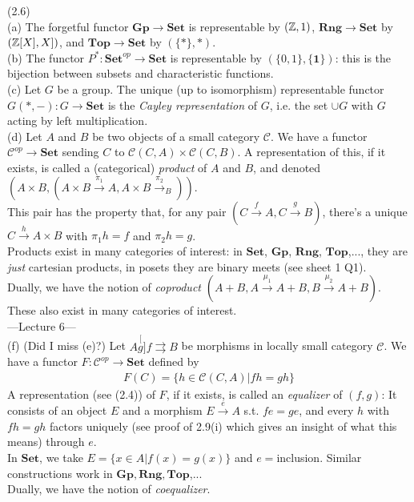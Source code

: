 \documentclass[a4paper]{article}
\begin{document}
\begin{eg} (2.6)\\
    (a) The forgetful functor $\mathbf{Gp} \to \mathbf{Set}$ is representable by $(\mathbb{Z},1)$, $\mathbf{Rng} \to \mathbf{Set}$ by $(\mathbb{Z}[X],X])$, and $\mathbf{Top} \to \mathbf{Set}$ by $(\{*\},*)$.\\
    (b) The functor $P^*: \mathbf{Set}^{op} \to \mathbf{Set}$ is representable by $(\{0,1\},\{\mathbf{1}\})$: this is the bijection between subsets and characteristic functions.\\
    (c) Let $G$ be a group. The unique (up to isomorphism) representable functor $G(*,-): G \to \mathbf{Set}$ is the \emph{Cayley representation} of $G$, i.e. the set $\cup G$ with $G$ acting by left multiplication.\\
    (d) Let $A$ and $B$ be two objects of a small category $\mathcal{C}$. We have a functor $\mathcal{C}^{op} \to \mathbf{Set}$ sending $C$ to $\mathcal{C}(C,A) \times \mathcal{C}(C,B)$. A representation of this, if it exists, is called a (categorical) \emph{product} of $A$ and $B$, and denoted $(A \times B,(A \times B \xrightarrow{\pi_1} A, A \times B \xrightarrow{\pi_2}_B))$.\\
    This pair has the property that, for any pair $(C \xrightarrow{f}A,C\xrightarrow{g}B)$, there's a unique $C \xrightarrow{h} A \times B$ with $\pi_1 h = f$ and $\pi_2 h = g$.\\
    Products exist in many categories of interest: in $\mathbf{Set}$, $\mathbf{Gp}$, $\mathbf{Rng}$, $\mathbf{Top}$,..., they are \emph{just} cartesian products, in posets they are binary meets (see sheet 1 Q1).\\
    Dually, we have the notion of \emph{coproduct} $(A+B,A \xrightarrow{\mu_1} A + B, B \xrightarrow{\mu_2}A+B)$.\\
    These also exist in many categories of interest.\\
    ---Lecture 6---\\
    (f) (Did I miss (e)?) Let $A \stackrel[g]{f}{\rightrightarrows} B$ be morphisms in locally small category $\mathcal{C}$. We have a functor $F:\mathcal{C}^{op} \to \mathbf{Set}$ defined by 
    \begin{equation*}
        \begin{aligned}
            F(C) = \{h \in \mathcal{C}(C,A) | fh = gh\}
        \end{aligned}
    \end{equation*}
    A representation (see (2.4)) of $F$, if it exists, is called an \emph{equalizer} of $(f,g)$: It consists of an object $E$ and a morphism $E \xrightarrow{e} A$ s.t. $fe=ge$, and every $h$ with $fh=gh$ factors uniquely (see proof of 2.9(i) which gives an insight of what this means) through $e$.\\
    In $\mathbf{Set}$, we take $E = \{x \in A | f(x) = g(x) \}$ and $e=$inclusion. Similar constructions work in $\mathbf{Gp},\mathbf{Rng},\mathbf{Top}$,...\\
    Dually, we have the notion of \emph{coequalizer}.
\end{eg}
\end{document}
